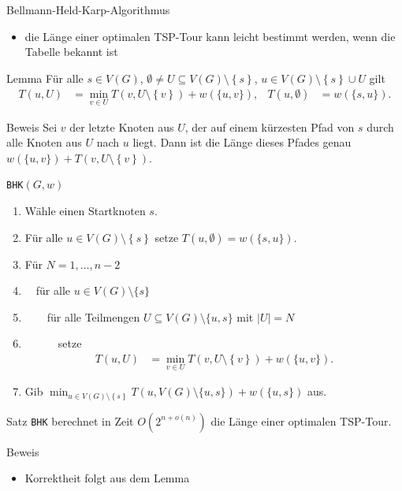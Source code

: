 \documentclass[aspectratio=1610, 11pt]{beamer}
\newcommand\cbc[1]{\left\{{#1}\right\}}
\begin{document}
\begin{frame}
\begin{overprint}
\begin{exampleblock}{Bellmann-Held-Karp-Algorithmus}
\begin{itemize}
				\item die L\"ange einer optimalen TSP-Tour kann leicht bestimmt werden, wenn die Tabelle bekannt ist
			\end{itemize}
		\end{exampleblock}
		\begin{block}{Lemma}
			F\"ur alle $s\in V(G)$, $\emptyset\neq U\subseteq V(G)\setminus\cbc s$, $u\in V(G)\setminus\cbc s\cup U$ gilt
			\begin{align*}
				T(u,U)&=\min_{v\in U}T(v,U\setminus\cbc v)+w(\{u,v\}),&T(u,\emptyset)&=w(\{s,u\}).
			\end{align*}
		\end{block}
		\begin{exampleblock}{Beweis}
			Sei $v$ der letzte Knoten aus $U$, der auf einem k\"urzesten Pfad von $s$ durch alle Knoten aus $U$ nach $u$ liegt.
			Dann ist die L\"ange dieses Pfades genau $w(\{u,v\})+T(v,U\setminus\cbc v)$.
		\end{exampleblock}
		\begin{exampleblock}{\tt BHK$(G,w)$}
			\begin{enumerate}
				\item W\"ahle einen Startknoten $s$.
				\item F\"ur alle $u\in V(G)\setminus\cbc s$ setze $T(u,\emptyset)=w(\{s,u\})$.
				\item F\"ur $N=1,\ldots,n-2$
				\item $\quad$f\"ur alle $u\in V(G)\setminus\{s\}$
				\item $\quad\quad$f\"ur alle Teilmengen $U\subseteq V(G)\setminus\{u,s\}$ mit $|U|=N$
				\item $\quad\quad\quad$setze
					\begin{align*}
						T(u,U)&=\min_{v\in U}T(v,U\setminus\cbc v)+w(\{u,v\}).
					\end{align*}
				\item Gib $\min_{u\in V(G)\setminus\cbc s}T(u,V(G)\setminus\{u,s\})+w(\{u,s\})$ aus.
			\end{enumerate}
		\end{exampleblock}
		\begin{block}{Satz}
			{\tt BHK} berechnet in Zeit $O(2^{n+o(n)})$ die L\"ange einer optimalen TSP-Tour.
		\end{block}
		\begin{exampleblock}{Beweis}
			\begin{itemize}
				\item Korrektheit folgt aus dem Lemma

\end{itemize}
\end{exampleblock}
\end{overprint}
\end{frame}
\end{document}
